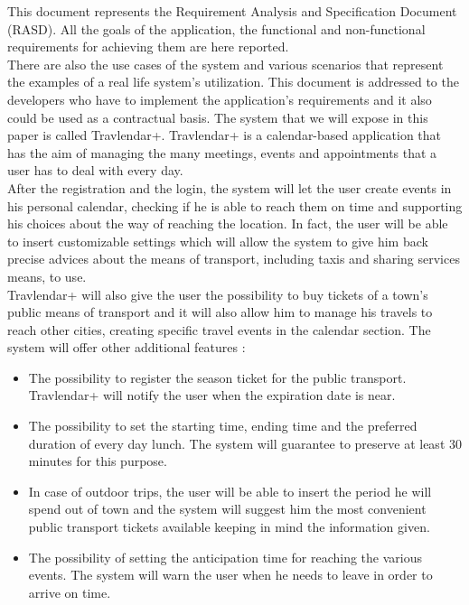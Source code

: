 \vspace*{-5mm}
This document represents the Requirement Analysis and Specification Document (RASD).
All the goals of the application, the functional and non-functional requirements for achieving them are here reported.\\
\indent There are also the use cases of the system and various scenarios that represent the examples of a real life system’s utilization.
This document is addressed to the developers who have to implement the application’s requirements and it also could be used as a contractual basis.
The system that we will expose in this paper is called Travlendar+. 
Travlendar+ is a calendar-based application that has the aim of managing the many meetings, events and appointments that a user has to deal with every day.\\
\indent After the registration and the login, the system will let the user create events in his personal calendar, checking if he is able to reach them on time and supporting his choices about the way of reaching the location. In fact, the user will be able to insert customizable settings which will allow the system to give him back precise advices about the means of transport, including taxis and sharing services means, to use.\\
\indent Travlendar+ will also give the user the possibility to buy tickets of a town’s public means of transport and it will also allow him to manage his travels to reach other cities, creating specific travel events in the calendar section.
The system will offer other additional features :
\begin{itemize}
\setlength{\leftskip}{0.5cm}
\item The possibility to register the season ticket for the public transport. Travlendar+ will notify the user when the expiration date is near.
\item The possibility to set the starting time, ending time and the preferred duration of every day lunch. The system will guarantee to preserve at least 30 minutes for this purpose.
\item In case of outdoor trips, the user will be able to insert the period he will spend out of town and the system will suggest him the most convenient public transport tickets available keeping in mind the information given.
\item The possibility of setting the anticipation time for reaching the various events. The system will warn the user when he needs to leave in order to arrive on time.
\end{itemize}
